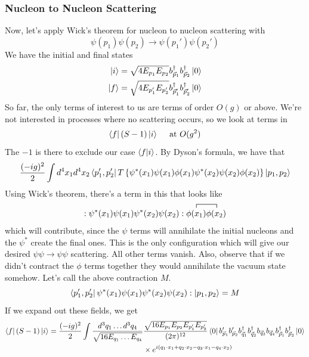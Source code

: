 \documentclass[11pt, oneside]{article}   	%
\theoremstyle{newline}
\theoremstyle{newline}
\theoremstyle{newline}
\theoremstyle{newline}
\theoremstyle{newline}
\begin{document}
\subsubsection{Nucleon to Nucleon Scattering} 
Now, let's apply Wick's theorem for nucleon to nucleon scattering with 
\[
\psi ( p_1) \psi ( p_2 ) \to \psi ( p_1' ) \psi ( p_2' ) 
\] We have the initial and final states
\begin{align*}
\ket{ i } & = \sqrt{4 E_{ p_1 } E_{ p_2 }} b_{ \vec{p}_ 1 } ^ \dagger b_{ \vec{p} _ 2 }^\dagger \ket{ 0 }  \\
\ket{ f} &= \sqrt{ 4 E_{ p_1 ' } E_{ p_2 ' } }  b_{ \vec{p}_1 ' } ^ \dagger b_{ \vec{p}_ 2 ' }^ \dagger \ket{ 0 } 
\end{align*}
So far, the only terms of interest to us 
are terms of order $ O ( g )  $ or above. 
We're not interested in processes where no scattering occurs, so 
we look at terms in 
\[
\bra{ f}  ( S - 1) \ket{ i } \quad \text{ at  } O ( g ^ 2)  
\]  The $ -1 $ is there to exclude our case $ \bra { f} \ket { i } $. 
By Dyson's formula, we have that 
\[
\frac{( - i g ) ^ 2 }{ 2 } \int d^ 4 x_1 d^ 4 x_2 \bra{ p_1' , p_2' } T \left\{ \psi^ * ( x_1) \psi ( x_1 ) \phi ( x_1 ) \psi ^ * ( x_2 ) \psi ( x_2 ) \phi ( x_2 )   \right\} \ket { p_1, p_2 }  
\] Using Wick's theorem, 
there's a term in this that looks like 
\[
: \psi ^ * ( x_1 ) \psi ( x_1) \psi ^ * ( x_2 ) \psi ( x_2) : \contraction{ } { \phi ( x_1 ) } { } { \phi ( x_2 ) } \phi ( x_1 ) \phi ( x_2 ) 
\] which will contribute, since the $ \psi $ terms 
will annihilate the initial nucleons and the  $ \psi ^ * $ 
create the final ones. This is the only configuration which 
will give our desired $ \psi \psi \to \psi \psi $ scattering. 
All other terms vanish. Also, observe that if we didn't contract the $ \phi $ terms together 
they would annihilate the vacuum state somehow. Let's call the above contraction $M $.  
\[
\bra{ p_1 ' , p_2 ' }  \psi ^ * ( x_1 ) \psi ( x_1) \psi ^ * ( x_2 ) \psi ( x_2 ) : \ket{ p_1, p_2 }  = M 
\] If we expand out these fields, we
get 
\begin{align*}
\bra { f} ( S - 1 ) \ket { i } = \frac{( - i g )^ 2  }{ 2}\int \frac{ d^ 3 q_1 \dots d^ 3 q_4 }{ \sqrt{ 16 E_{ q_1 } \dots E_{ q_ 4}} } & \frac{ \sqrt{ 16 E_{ p_1 } E_{ p_2 } E_{p_1 ' } E_{ p _ 2 ' }} }{ ( 2 \pi ) ^{ 1 2 }} \bra{ 0 } b_{ \vec{p}_ 1  } '  b _{ \vec{p}_ 2 } ' b_{ \vec{q}_ 1 }^ \dagger b _{ \vec{q}_ 2 } ^ \dagger b_{ \vec{q} _  3} b_{ \vec{q}_ 4 } b _{ \vec{p}_1 } ^ \dagger b _{ \vec{p}_ 2 } ^ \dagger \ket{ 0 } \\
																	& \times e^{ i ( q_1 \cdot  x_1 + q_2 \cdot  x_2 - q_3 \cdot  x_1 - q_4 \cdot  x_2) }
\end{align*} 
\end{document}
